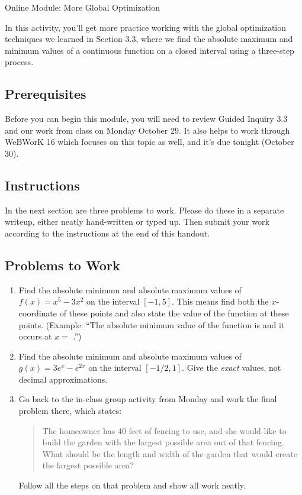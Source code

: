 \documentclass[11pt]{article}
\begin{document}
\begin{center}
    \Large{Online Module: More Global Optimization}
\end{center}

\noindent
In this activity, you'll get more practice working with the global optimization techniques we learned in Section 3.3, where we find the absolute maximum and minimum values of a continuous function on a closed interval using a three-step process. 

\subsection*{Prerequisites}

Before you can begin this module, you will need to review Guided Inquiry 3.3 and our work from class on Monday October 29. It also helps to work through WeBWorK 16 which focuses on this topic as well, and it's due tonight (October 30). 

\subsection*{Instructions}

In the next section are three problems to work. Please do these in a separate writeup, either neatly hand-written or typed up. Then submit your work according to the instructions at the end of this handout. 


\subsection*{Problems to Work}
    
\begin{enumerate}

\item Find the absolute minimum and absolute maximum values of $f(x) = x^5 - 3x^2$ on the interval $[-1,5]$. This means find both the $x$-coordinate of these points and also state the value of the function at these points. (Example: ``The absolute minimum value of the function is \underline{\hspace{0.2in}} and it occurs at $x=$ \underline{\hspace{0.2in}}.'')

\item Find the absolute minimum and absolute maximum values of $g(x) = 3e^x - e^{2x}$ on the interval $[-1/2,1]$. Give the \emph{exact} values, not decimal approximations. 

\item Go back to the in-class group activity from Monday and work the final problem there, which states: 

\begin{quote}
    The homeowner has 40 feet of fencing to use, and she would like to build the garden with the largest possible area out of that fencing. What should be the length and width of the garden that would create the largest possible area? 
\end{quote}

Follow all the steps on that problem and show all work neatly. 

\end{enumerate}
\end{document}
